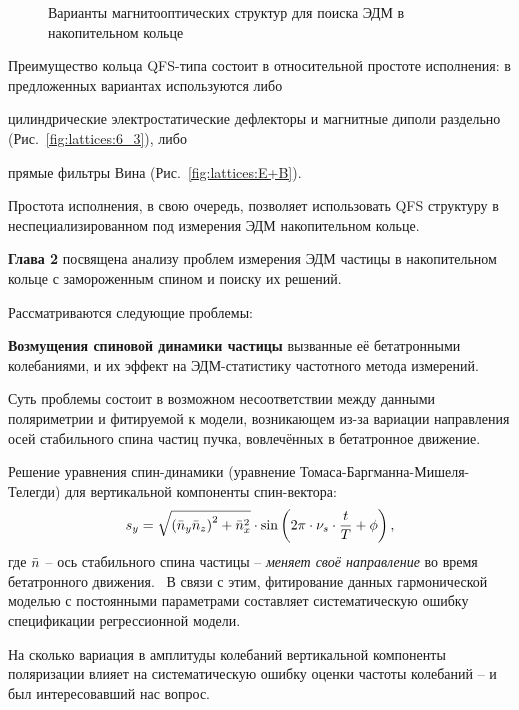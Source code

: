 \begin{figure}[H]
\begin{minipage}{.5\linewidth}{
	}
\end{minipage}%
\begin{minipage}{.5\linewidth}
\caption{Варианты магнитооптических структур для поиска ЭДМ в накопительном кольце}
\end{minipage}
\end{figure}

Преимущество кольца QFS-типа состоит в относительной простоте исполнения: 
в предложенных вариантах используются либо
\begin{enumerate*}
	\item цилиндрические электростатические дефлекторы и магнитные диполи раздельно
	 (Рис.~\ref{fig:lattices:6_3}), либо
	\item прямые фильтры Вина (Рис.~\ref{fig:lattices:E+B}).	
\end{enumerate*}
Простота исполнения, в свою очередь, позволяет использовать QFS структуру в неспециализированном под
измерения ЭДМ накопительном кольце.

\textbf{Глава 2} посвящена анализу проблем измерения ЭДМ частицы 
в накопительном кольце с замороженным спином и поиску их решений. 

Рассматриваются следующие проблемы:

\textbf{Возмущения спиновой динамики частицы} вызванные её бетатронными колебаниями, и их эффект на ЭДМ-статистику частотного метода измерений.

Суть проблемы состоит в возможном несоответствии между данными поляриметрии и фитируемой к модели, 
возникающем из-за вариации направления осей стабильного спина частиц пучка, 
вовлечённых в бетатронное движение.

Решение уравнения спин-динамики (уравнение Томаса-Баргманна-Мишеля-Телегди)
для вертикальной компоненты спин-вектора:
\begin{equation}\label{eq:sy_analytic}
s_y = \sqrt{\bkt{\bar n_y\bar n_z}^2 + \bar n_x^2} \cdot \sin\bkt{2\pi\cdot\nu_s\cdot \frac{t}{T} + \phi},
\end{equation}
где $\bar n$ -- ось стабильного спина частицы -- \emph{меняет своё направление} во время бетатронного движения.~\cite[стр.~11]{Shatunov} В связи с этим, фитирование данных гармонической моделью с постоянными
параметрами составляет систематическую ошибку спецификации регрессионной модели.

На сколько вариация в амплитуды колебаний вертикальной
компоненты поляризации влияет на систематическую ошибку оценки частоты колебаний -- 
и был интересовавший нас вопрос.

